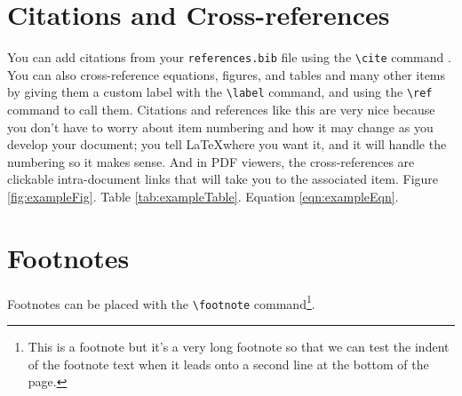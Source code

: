 \section*{Citations and Cross-references}
You can add citations \cite{customBibLabel} from \cite{Q} your \texttt{references.bib} file \cite{Burka:1993a} using the \texttt{\textbackslash cite} command \cite{customBibLabel2}. You can also cross-reference equations, figures, and tables and many other items by giving them a custom label with the \texttt{\textbackslash label} command, and using the  \texttt{\textbackslash ref} command to call them. Citations and references like this are very nice because you don't have to worry about item numbering and how it may change as you develop your document; you tell \LaTeX where you want it, and it will handle the numbering so it makes sense. And in PDF viewers, the cross-references are clickable intra-document links that will take you to the associated item. Figure \ref{fig:exampleFig}. Table \ref{tab:exampleTable}. Equation \ref{eqn:exampleEqn}.

\section*{Footnotes}
Footnotes can be placed with the \texttt{\textbackslash footnote} command\footnote{This is a footnote but it's a very long footnote so that we can test the indent of the footnote text when it leads onto a second line at the bottom of the page.}. 
